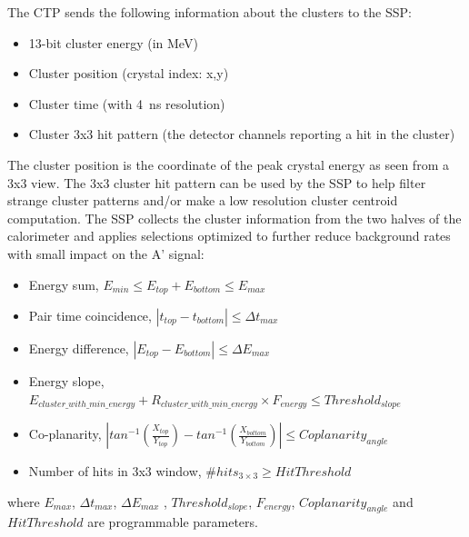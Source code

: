 

The CTP sends the following information about the clusters to the SSP:
\begin{itemize}
\item 13-bit cluster energy (in MeV)
\item Cluster position (crystal index: x,y)
\item Cluster time (with 4~ns resolution)
\item Cluster 3x3 hit pattern (the detector channels reporting a hit in the cluster)
\end{itemize}
The cluster position is the coordinate of the peak crystal energy as seen from a 3x3 view. The 3x3 cluster hit pattern can be used by the SSP to help filter strange cluster patterns and/or make a low resolution cluster centroid computation.
The SSP collects the cluster information from the two halves of the calorimeter and applies selections optimized to further reduce background rates with small impact on the A' signal:
\begin{itemize}
\item Energy sum,  
$E_{min}\le E_{top}+E_{bottom}\le E_{max}$
\item Pair time coincidence, 
$|t_{top}-t_{bottom}|\le \Delta t_{max}$ 
\item Energy difference, 
$|E_{top}-E_{bottom}|\le \Delta E_{max}$ 
\item Energy slope,
$E_{cluster\_with\_min\_energy}+R_{cluster\_with\_min\_energy}\times F_{energy}\le Threshold_{slope}$
\item Co-planarity, 
$|
tan^{-1}(\frac{X_{top}}{Y_{top}})-
tan^{-1}(\frac{X_{bottom}}{Y_{bottom}}) |\le Coplanarity_{angle}$
\item Number of hits in 3x3 window, 
\#$hits_{3\times 3}\ge HitThreshold$
\end{itemize}
\noindent
where $ E_{max}$,  $\Delta t_{max}$, $ \Delta E_{max}$ , $Threshold_{slope}$, 
$F_{energy}$, $Coplanarity_{angle}$
and
$HitThreshold$ are programmable parameters.

